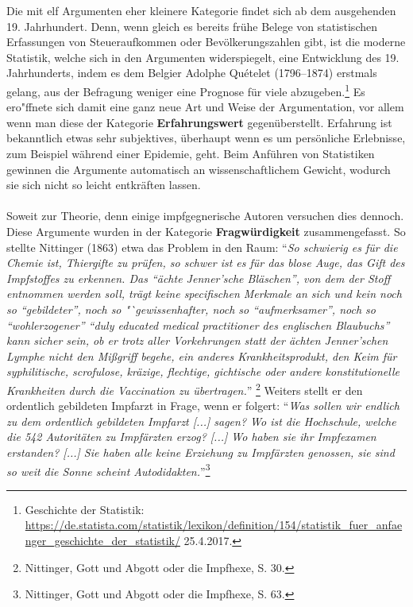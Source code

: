 \documentclass[
    a4paper,
    12pt,
    hyphens,
    chapterprefix=true,
    headheight=33pt,
    footheight=29pt,
    headings=optiontohead,
]{scrartcl}
\begin{document}
{Die mit elf Argumenten eher kleinere Kategorie findet sich ab dem ausgehenden 19. Jahrhundert. Denn, wenn gleich es bereits frühe Belege von statistischen Erfassungen von Steueraufkommen oder Bevölkerungszahlen gibt, ist die moderne Statistik, welche sich in den Argumenten widerspiegelt, eine Entwicklung des 19. Jahrhunderts, indem es dem Belgier Adolphe Quételet (1796--1874) erstmals gelang, aus der Befragung weniger eine Prognose für viele abzugeben.\footnote{Geschichte der Statistik: \url{https://de.statista.com/statistik/lexikon/definition/154/statistik_fuer_anfaenger_geschichte_der_statistik/} 25.4.2017.} Es ero"ffnete sich damit eine ganz neue Art und Weise der Argumentation, vor allem wenn man diese der Kategorie \textbf{Erfahrungswert} gegenüberstellt. Erfahrung ist bekanntlich etwas sehr subjektives, überhaupt wenn es um persönliche Erlebnisse, zum Beispiel während einer Epidemie, geht. Beim Anführen von Statistiken gewinnen die Argumente automatisch an wissenschaftlichem Gewicht, wodurch sie sich nicht so leicht entkräften lassen. \\
\\
Soweit zur Theorie, denn einige impfgegnerische Autoren versuchen dies dennoch. Diese Argumente wurden in der Kategorie \textbf{Fragwürdigkeit}
zusammengefasst. So stellte Nittinger (1863) etwa das Problem in den Raum: "`\textit{So schwierig es für die Chemie ist, Thiergifte zu prüfen,
so schwer ist es für das blose Auge, das Gift des Impfstoffes zu erkennen. Das "`ächte Jenner'sche Bläschen"', von dem der Stoff entnommen
werden soll, trägt keine specifischen Merkmale an sich und kein noch so "`gebildeter"', noch so "`gewissenhafter, noch so "`aufmerksamer"', noch
so "`wohlerzogener"' "`duly educated medical practitioner des englischen Blaubuchs"' kann sicher sein, ob er trotz aller Vorkehrungen statt der
ächten Jenner'schen Lymphe nicht den Mißgriff begehe, ein anderes Krankheitsprodukt, den Keim für syphilitische, scrofulose, kräzige, flechtige,
gichtische oder andere konstitutionelle Krankheiten
durch die Vaccination zu übertragen.}"'
\footnote{Nittinger, Gott und Abgott oder die
Impfhexe, S. 30.} Weiters stellt er den ordentlich gebildeten Impfarzt in Frage, wenn er folgert: "`\textit{Was sollen wir endlich zu dem
ordentlich gebildeten Impfarzt [...] sagen? Wo ist die Hochschule, welche die 542 Autoritäten zu Impfärzten erzog? [...] Wo haben sie ihr
Impfexamen erstanden? [...] Sie haben alle keine Erziehung zu Impfärzten genossen, sie sind so weit die Sonne scheint
Autodidakten.}"'\footnote{Nittinger, Gott und Abgott oder die Impfhexe, S. 63.} \\
}
\end{document}
